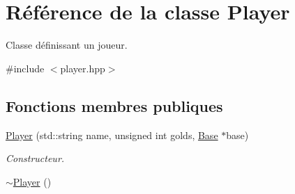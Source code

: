 \hypertarget{classPlayer}{\section{Référence de la classe Player}
\label{classPlayer}
}


Classe définissant un joueur.  




{\ttfamily \#include $<$player.\+hpp$>$}

\subsection*{Fonctions membres publiques}
\begin{DoxyCompactItemize}
\item 
\hypertarget{classPlayer_a64124cbd4f373c5b7ebec1aaee471e06}{\hyperlink{classPlayer_a64124cbd4f373c5b7ebec1aaee471e06}{Player} (std\+::string name, unsigned int golds, \hyperlink{classBase}{Base} $\ast$base)}\label{classPlayer_a64124cbd4f373c5b7ebec1aaee471e06}

\begin{DoxyCompactList}\small\item\em Constructeur. \end{DoxyCompactList}\item 
\hypertarget{classPlayer_a749d2c00e1fe0f5c2746f7505a58c062}{\hyperlink{classPlayer_a749d2c00e1fe0f5c2746f7505a58c062}{$\sim$\+Player} ()}\label{classPlayer_a749d2c00e1fe0f5c2746f7505a58c062}


\end{DoxyCompactItemize}
